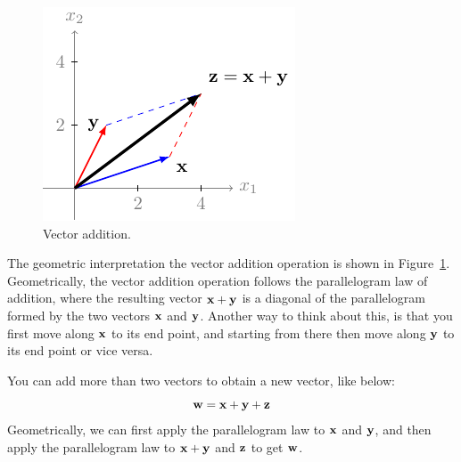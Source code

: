 \begin{itemize}
    \begin{figure}[h!]
        \centering
        \includegraphics{figure/chapter01/vec-add-fig.pdf}
        \caption{Vector addition.}
        \label{fig:vec-add}
    \end{figure}

    The geometric interpretation the vector addition operation is shown in Figure~\ref{fig:vec-add}. Geometrically, the vector addition operation follows the parallelogram law of addition, where the resulting vector $\mathbf{x} + \mathbf{y}$ is a diagonal of the parallelogram formed by the two vectors $\mathbf{x}$ and $\mathbf{y}$. Another way to think about this, is that you first move along $\mathbf{x}$ to its end point, and starting from there then move along $\mathbf{y}$ to its end point or vice versa.

    You can add more than two vectors to obtain a new vector, like below:
    \[ \mathbf{w} = \mathbf{x} + \mathbf{y} + \mathbf{z} \]
    Geometrically, we can first apply the parallelogram law to $\mathbf{x}$ and $\mathbf{y}$, and then apply the parallelogram law to $\mathbf{x} + \mathbf{y}$ and $\mathbf{z}$ to get $\mathbf{w}$.
\end{itemize}


